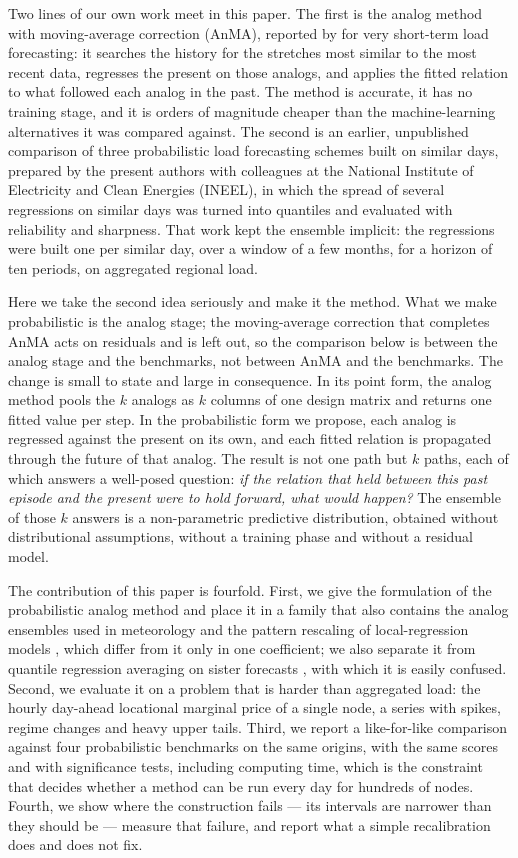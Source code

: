 \documentclass[12pt,a4paper]{article}
\begin{document}
Two lines of our own work meet in this paper. The first is the analog method
with moving-average correction (AnMA), reported by \citet{LezamaLope2023} for
very short-term load forecasting: it searches the history for the stretches
most similar to the most recent data, regresses the present on those analogs,
and applies the fitted relation to what followed each analog in the past. The
method is accurate, it has no training stage, and it is orders of magnitude
cheaper than the machine-learning alternatives it was compared against. The
second is an earlier, unpublished comparison of three probabilistic load
forecasting schemes built on similar days, prepared by the present authors
with colleagues at the National Institute of Electricity and Clean Energies
(INEEL), in which the spread of several regressions on similar days was turned
into quantiles and evaluated with reliability and sharpness. That work kept the ensemble implicit: the
regressions were built one per similar day, over a window of a few months, for
a horizon of ten periods, on aggregated regional load.

Here we take the second idea seriously and make it the method. What we make
probabilistic is the analog stage; the moving-average correction that
completes AnMA acts on residuals and is left out, so the comparison below is
between the analog stage and the benchmarks, not between AnMA and the
benchmarks. The change is
small to state and large in consequence. In its point form, the analog method
pools the $k$ analogs as $k$ columns of one design matrix and returns one
fitted value per step. In the probabilistic form we propose, each analog is
regressed against the present on its own, and each fitted relation is
propagated through the future of that analog. The result is not one path but
$k$ paths, each of which answers a well-posed question: \emph{if the relation
that held between this past episode and the present were to hold forward, what
would happen?} The ensemble of those $k$ answers is a non-parametric
predictive distribution, obtained without distributional assumptions, without
a training phase and without a residual model.

The contribution of this paper is fourfold. First, we give the formulation of
the probabilistic analog method and place it in a family that also contains
the analog ensembles used in meteorology
\citep{DelleMonache2013,Alessandrini2015} and the pattern rescaling of
local-regression models \citep{Dudek2016}, which differ from it only in one
coefficient; we also separate it from quantile regression averaging on sister
forecasts \citep{Liu2017}, with which it is easily confused. Second, we
evaluate it on a problem that is harder than aggregated load: the hourly
day-ahead locational marginal price of a single node, a series with spikes,
regime changes and heavy upper tails. Third, we report a like-for-like
comparison against four probabilistic benchmarks on the same origins, with the
same scores and with significance tests, including computing time, which is the
constraint that decides whether a method can be run every day for hundreds of
nodes. Fourth, we show where the construction fails — its intervals are
narrower than they should be — measure that failure, and report what a simple
recalibration does and does not fix.
\end{document}
